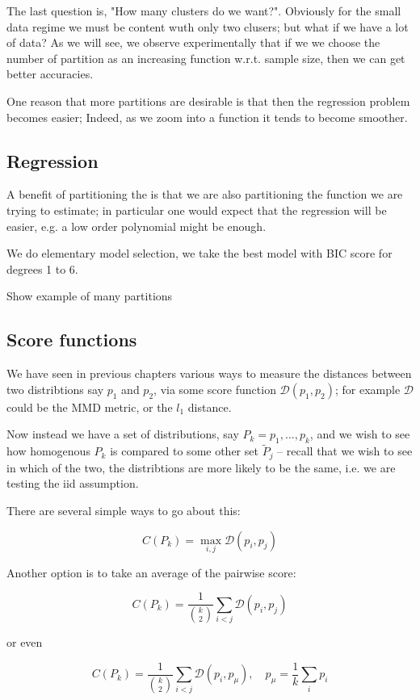 The last question is, "How many clusters do we want?". Obviously for the small data regime we must be content 
wuth only two clusers; but what if we have a lot of data? As we will see, we observe experimentally that if we 
we choose the number of partition as an increasing function w.r.t. sample size, then we can get better accuracies.

One reason that more partitions are desirable is that then the regression problem becomes easier; Indeed, as we 
zoom into a function it tends to become smoother.


\subsection{Regression}

A benefit of partitioning the is that we are also partitioning the function we are trying to estimate; in 
particular one would expect that the regression will be easier, e.g. a low order polynomial might be enough.

We do elementary model selection, we take the best model with BIC score for degrees 1 to 6. 

Show example of many partitions

\subsection{Score functions}

We have seen in previous chapters various ways to measure the distances between two distribtions say 
$p_1$ and $p_2$, via some score function $\mathcal{D}(p_1, p_2)$; for example $\mathcal{D}$ could be the 
MMD metric, or the $l_1$ distance.

Now instead we have a set of distributions, say $P_k = p_1, ..., p_k$, and we wish to see how homogenous
$P_k$ is compared to some other set $\tilde{P}_j$ -- recall that we wish to see in which of the two, 
 the distribtions are more likely to be the same, i.e. we are testing the iid assumption. 

There are several simple ways to go about this:

$$
    C(P_k) = \operatorname{max}_{i, j} \mathcal{D}(p_i, p_j)
$$

Another option is to take an average of the pairwise score:

$$
    C(P_k) = \frac{1}{\binom{k}{2}} \sum_{i < j} \mathcal{D}(p_i, p_j)
$$

or even 

$$
    C(P_k) = \frac{1}{\binom{k}{2}} \sum_{i < j} \mathcal{D}(p_i, p_\mu)
    , \quad p_\mu = \frac{1}{k} \sum_i p_i
$$


